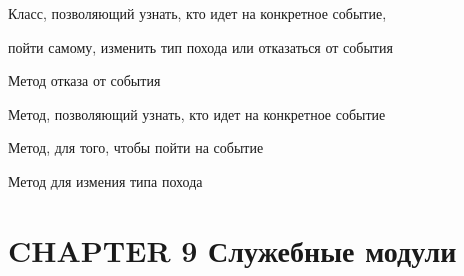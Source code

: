 \documentclass[letterpaper,10pt,english]{sphinxmanual}
\begin{document}
\begin{fulllineitems}
\label{MeTooManager:mainServer.MeTooManager.MeTooManager}
Класс, позволяющий узнать, кто идет на конкретное событие,

пойти самому, изменить тип похода или отказаться от события

\begin{fulllineitems}
\label{MeTooManager:mainServer.MeTooManager.MeTooManager.delMeToo}
Метод отказа от события

\end{fulllineitems}


\begin{fulllineitems}
\label{MeTooManager:mainServer.MeTooManager.MeTooManager.getUsersbyEvent}
Метод, позволяющий узнать, кто идет на конкретное событие

\end{fulllineitems}


\begin{fulllineitems}
\label{MeTooManager:mainServer.MeTooManager.MeTooManager.meToo}
Метод, для того, чтобы пойти на событие

\end{fulllineitems}


\begin{fulllineitems}
\label{MeTooManager:mainServer.MeTooManager.MeTooManager.modMeToo}
Метод для измения типа похода

\end{fulllineitems}


\end{fulllineitems}



\chapter{CHAPTER 9 Служебные модули}
\label{config:chapter-9}\label{config::doc}
\end{document}
